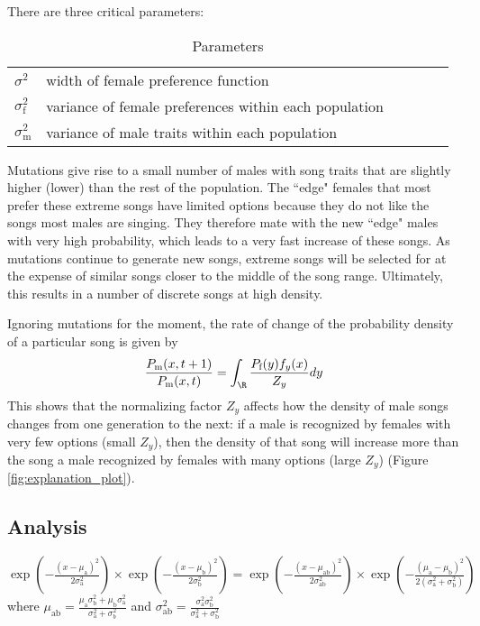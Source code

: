 \documentclass{article}
\newcommand{\ra}[1]{\renewcommand{\arraystretch}{#1}}
\begin{document}
There are three critical parameters:
\begin{table}
\caption{\label{parameters} Parameters}
\ra{1.3}
\begin{tabular}{llllll}
$\sigma^2$ & width of female preference function
\\$\sigma_\text{f}^2$ & variance of female preferences within each population
\\$\sigma_\text{m}^2$ & variance of male traits within each population
\end{tabular}
\end{table}

Mutations give rise to a small number of males with song traits that are slightly higher (lower) than the rest of the population. The ``edge" females that most prefer these extreme songs have limited options because they do not like the songs most males are singing. They therefore mate with the new ``edge" males with very high probability, which leads to a very fast increase of these songs. As mutations continue to generate new songs, extreme songs will be selected for at the expense of similar songs closer to the middle of the song range. Ultimately, this results in a number of discrete songs at high density.

Ignoring mutations for the moment, the rate of change of the probability density of a particular song is given by 
\begin{equation}
\frac{P_\text{m}(x,t+1)}{P_\text{m}(x,t)}= \int _\R\frac{ P_\text{f}(y)f_y(x)}{Z_y}dy \label{growth}
\end{equation}
This shows that the normalizing factor $Z_y$ affects how the density of male songs changes from one generation to the next: if a male is recognized by females with very few options (small $Z_y$), then the density of that song will increase more than the song a male recognized by females with many options (large $Z_y$) (Figure \ref{fig:explanation_plot}).

\subsection{Analysis} 
\begin{claim} \label{norm_prod} $\exp\left(-\frac{(x-\mu_\text{a})^2}{2\sigma_\text{a}^2}\right)\times \exp\left(-\frac{(x-\mu_\text{b})^2}{2\sigma_\text{b}^2}\right)=\exp\left(-\frac{(x-\mu_\text{ab})^2}{2\sigma_\text{ab}^2}\right)\times\exp\left(-\frac{(\mu_\text{a}-\mu_\text{b})^2}{2(\sigma_\text{a}^2+\sigma_\text{b}^2)}\right)$ where $\mu_\text{ab}=\frac{\mu_\text{a}\sigma_\text{b}^2+\mu_\text{b}\sigma_\text{a}^2}{\sigma_\text{a}^2+\sigma_b^2}$ and $\sigma_\text{ab}^2=\frac{\sigma_\text{a}^2\sigma_\text{b}^2}{\sigma_\text{a}^2+\sigma_\text{b}^2}$
\end{claim}
\end{document}
